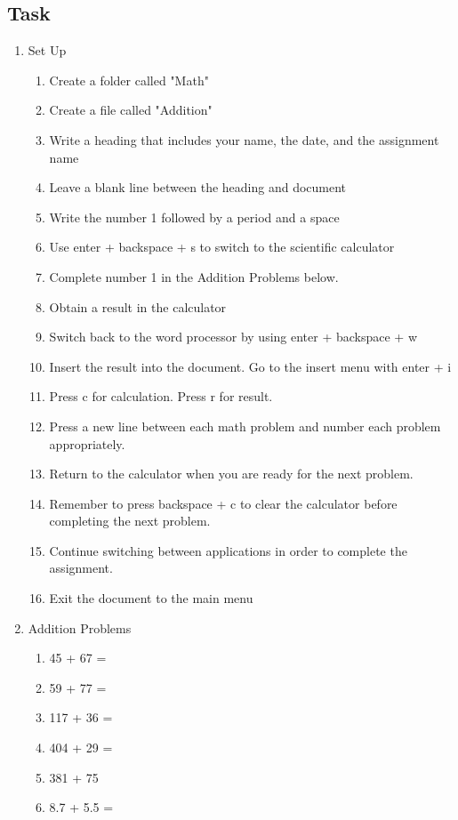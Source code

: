 \documentclass[10pt,letterpaper,twoside]{report}
\begin{document}
{{{\subsection{Task}
\begin{enumerate}
	\item Set Up
	      \begin{enumerate}
		      \item Create a folder called "Math"
		      \item Create a file called "Addition"
		      \item Write a heading that includes your name, the date, and the assignment name
		      \item Leave a blank line between the heading and document
		      \item Write the number 1 followed by a period and a space
		      \item Use enter + backspace + s to switch to the scientific calculator
		      \item Complete number 1 in the Addition Problems below.
		      \item Obtain a result in the calculator
		      \item Switch back to the word processor by using enter + backspace + w
		      \item Insert the result into the document. Go to the insert menu with enter + i
		      \item Press c for calculation. Press r for result.
		      \item Press a new line between each math problem and number each problem appropriately.
		      \item Return to the calculator when you are ready for the next problem.
		      \item Remember to press backspace + c to clear the calculator before completing the next problem.
		      \item Continue switching between applications in order to complete the assignment.
		      \item Exit the document to the main menu
	      \end{enumerate}
	\item Addition Problems
	      \begin{enumerate}
		      \item 45 + 67 =
		      \item 59 + 77 =
		      \item 117 + 36 =
		      \item 404 + 29 =
		      \item 381 + 75
		      \item 8.7 + 5.5 =
	      \end{enumerate}
\end{enumerate}
\clearpage
}}}
\end{document}
